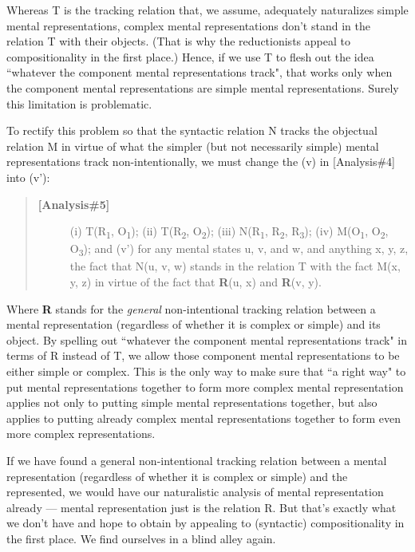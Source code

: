\documentclass[a4paper,12pt]{article}
\begin{document}
Whereas T is the tracking relation that, we assume, adequately naturalizes simple mental representations, complex mental representations don't stand in the relation T with their objects. (That is why the reductionists appeal to compositionality in the first place.) Hence, if we use T to flesh out the idea ``whatever the component mental representations track", that works only when the component mental representations are simple mental representations. Surely this limitation is problematic.

To rectify this problem so that the syntactic relation N tracks the objectual relation M in virtue of what the simpler (but not necessarily simple) mental representations track non-intentionally, we must change the (v) in [Analysis\#4] into (v'):

\begin{quote}
\begin{description}
\item[\textbf{[Analysis\#5]}] (i) T(R\textsubscript{1}, O\textsubscript{1}); (ii) T(R\textsubscript{2}, O\textsubscript{2}); (iii) N(R\textsubscript{1}, R\textsubscript{2}, R\textsubscript{3}); (iv) M(O\textsubscript{1}, O\textsubscript{2}, O\textsubscript{3}); and (v') for any mental states u, v, and w, and anything x, y, z, the fact that N(u, v, w) stands in the relation T with the fact M(x, y, z) in virtue of the fact that \textbf{R}(u, x) and \textbf{R}(v, y).
\end{description}
\end{quote}

Where \textbf{R} stands for the \emph{general} non-intentional tracking relation between a mental representation (regardless of whether it is complex or simple) and its object. By spelling out ``whatever the component mental representations track" in terms of R instead of T, we allow those component mental representations to be either simple or complex. This is the only way to make sure that ``a right way" to put mental representations together to form more complex mental representation applies not only to putting simple mental representations together, but also applies to putting already complex mental representations together to form even more complex representations.

If we have found a general non-intentional tracking relation between a mental representation (regardless of whether it is complex or simple) and the represented, we would have our naturalistic analysis of mental representation already --- mental representation just is the relation R. But that's exactly what we don't have and hope to obtain by appealing to (syntactic) compositionality in the first place. We find ourselves in a blind alley again.
\end{document}
